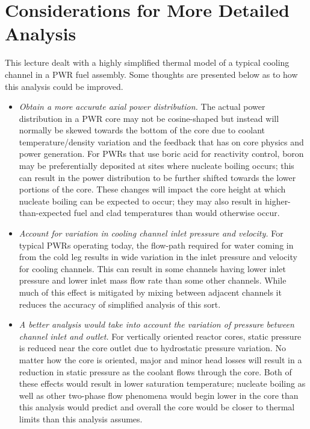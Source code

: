 \section{Considerations for More Detailed Analysis}
This lecture dealt with a highly simplified thermal model of a typical cooling channel in a PWR fuel assembly.  Some thoughts are presented below as to how this analysis could be improved.

\begin{itemize}
\item \emph{Obtain a more accurate axial power distribution.}  The actual power distribution in a PWR core may not be cosine-shaped but instead will normally be skewed towards the bottom of the core due to coolant temperature/density variation and the feedback that has on core physics and power generation.  For PWRs that use boric acid for reactivity control, boron may be preferentially deposited at sites where nucleate boiling occurs; this can result in the power distribution to be further shifted towards the lower portions of the core.  These changes will impact the core height at which nucleate boiling can be expected to occur; they may also result in higher-than-expected fuel and clad temperatures than would otherwise occur.

\item \emph{Account for variation in cooling channel inlet pressure and velocity.}  For typical PWRs operating today, the flow-path required for water coming in from the cold leg results in wide variation in the inlet pressure and velocity for cooling channels.  This can result in some channels having lower inlet pressure and lower inlet mass flow rate than some other channels.  While much of this effect is mitigated by mixing between adjacent channels it reduces the accuracy of simplified analysis of this sort.

\item \emph{A better analysis would take into account the variation of pressure between channel inlet and outlet.}  For vertically oriented reactor cores, static pressure is reduced near the core outlet due to hydrostatic pressure variation.  No matter how the core is oriented, major and minor head losses will result in a reduction in static pressure as the coolant flows through the core.  Both of these effects would result in lower saturation temperature; nucleate boiling as well as other two-phase flow phenomena would begin lower in the core than this analysis would predict and overall the core would be closer to thermal limits than this analysis assumes.


\end{itemize}
